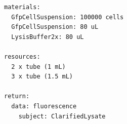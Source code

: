 \begin{lstlisting}[language={},basicstyle=\footnotesize\ttfamily,float=tp,caption={Compact execution result for the lysate clarification example, with the observation subject shown by its declared container label.},label={lst:lysate-execution-result}]
materials:
  GfpCellSuspension: 100000 cells
  GfpCellSuspension: 80 uL
  LysisBuffer2x: 80 uL

resources:
  2 x tube (1 mL)
  3 x tube (1.5 mL)

return:
  data: fluorescence
    subject: ClarifiedLysate
\end{lstlisting}
